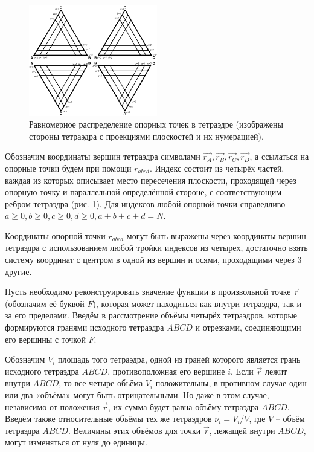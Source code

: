 \begin{figure}[h]
\centering
\includegraphics[width=0.5\textwidth]{png/tetr-interpolation-base-points.png}
\caption{Равномерное распределение опорных точек в тетраэдре (изображены стороны тетраэдра с проекциями плоскостей и их нумерацией).}
\label{pic:tetr-interpolation-base-points}
\end{figure}

Обозначим координаты вершин тетраэдра символами $\vec{r_A}, \vec{r_B}, \vec{r_C}, \vec{r_D}$, а ссылаться на опорные точки будем при помощи $r_{abcd}$. Индекс состоит из четырёх частей, каждая из которых описывает место пересечения плоскости, проходящей через опорную точку и параллельной определённой стороне, с соответствующим ребром тетраэдра (рис. \ref{pic:tetr-interpolation-base-points}). Для индексов любой опорной точки справедливо $a \ge 0, b \ge 0, c \ge 0, d \ge 0, a+b+c+d = N$.

Координаты опорной точки $r_{abcd}$ могут быть выражены через координаты вершин тетраэдра с использованием любой тройки индексов из четырех, достаточно взять систему координат с центром в одной из вершин и осями, проходящими через 3 другие.

Пусть необходимо реконструировать значение функции в произвольной точке $\vec{r}$ (обозначим её буквой $F$), которая может находиться как внутри тетраэдра, так и за его пределами. Введём в рассмотрение объёмы четырёх тетраэдров, которые формируются гранями исходного тетраэдра $ABCD$ и отрезками, соединяющими его вершины с точкой $F$.

Обозначим $V_i$ площадь того тетраэдра, одной из граней которого является грань исходного тетраэдра $ABCD$, противоположная его вершине $i$. Если $\vec{r}$ лежит внутри $ABCD$, то все четыре объёма $V_i$ положительны, в противном случае один или два «объёма» могут быть отрицательными. Но даже в этом случае, независимо от положения $\vec{r}$, их сумма будет равна объёму тетраэдра $ABCD$. Введём также относительные объёмы тех же тетраэдров $\nu_i = V_i / V$, где $V$ -- объём тетраэдра $ABCD$. Величины этих объёмов для точки $\vec{r}$, лежащей внутри $ABCD$, могут изменяться от нуля до единицы.

